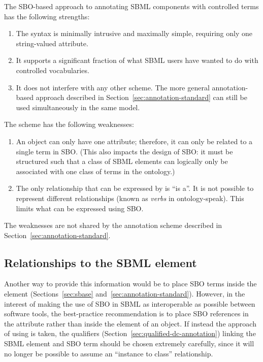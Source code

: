 The SBO-based approach to annotating SBML components with
controlled terms has the following strengths:
\begin{enumerate}

\item The syntax is minimally intrusive and maximally simple,
  requiring only one string-valued attribute.

\item It supports a significant fraction of what SBML users have wanted
  to do with controlled vocabularies.

\item It does not interfere with any other scheme.  The more
  general annotation-based approach described in
  Section~\ref{sec:annotation-standard} can still be used
  simultaneously in the same model.

\end{enumerate}

The scheme has the following weaknesses:
\begin{enumerate}

\item An object can only have one  attribute;
  therefore, it can only be related to a single term in SBO.
  (This also impacts the design of SBO: it must be structured such
  that a class of SBML elements can logically only be associated
  with one class of terms in the ontology.)

\item The only relationship that can be expressed by
   is ``is a''.  It is not possible to represent
  different relationships (known as \emph{verbs} in
  ontology-speak).  This limits what can be expressed using SBO.

\end{enumerate}



The weaknesses are not shared by the annotation scheme described
in Section~\ref{sec:annotation-standard}.  



\subsection{Relationships to the SBML  element}

Another way to provide this information would be to place SBO
terms inside the \SBase {} element
(Sections~\ref{sec:sbase} and~\ref{sec:annotation-standard}).
However, in the interest of making the use of SBO in SBML as
interoperable as possible between software tools, the
best-practice recommendation is to place SBO references in the
 attribute rather than inside the
 element of an object. If instead the approach
of using  is taken, the qualifiers
(Section~\ref{sec:qualified-dc-annotation}) linking the SBML
element and SBO term should be chosen extremely carefully, since
it will no longer be possible to assume an ``instance to class''
relationship.


